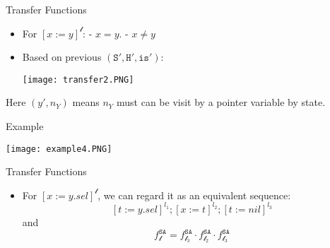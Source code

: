 \documentclass[aspectratio=1610, 13pt]{beamer}
\begin{document}
\begin{frame}{Transfer Functions}
    \begin{itemize}
        \item For $[x := y]^{\mathcal{l}}$: - $x = y$. - $x \ne y$
        \item Based on previous $(\texttt{S}', \texttt{H}', \texttt{is}')$:
        
    \begin{center}
        \texttt{[image: transfer2.PNG]}
    \end{center}
    \end{itemize}
    Here $(y', n_Y)$ means $n_Y$ must can be visit by a pointer variable by state.
\end{frame}
\begin{frame}{Example}

    \begin{center}
        \texttt{[image: example4.PNG]}
    \end{center}

    
\end{frame}

\begin{frame}{Transfer Functions}
\begin{itemize}
    \item For $[x := y.sel]^{\mathcal{l}}$, we can regard it as an equivalent sequence:
    \[[t:=y.sel]^{l_1};[x := t]^{l_2};[t := nil]^{l_3}\]
    and 
    \[{f_{\mathcal{l}}^\texttt{SA}} = {f_{\mathcal{l_3}}^\texttt{SA} \cdot f_{\mathcal{l_2}}^\texttt{SA} \cdot f_{\mathcal{l_3}}^\texttt{SA}}\]
\end{itemize}
\end{frame}
\end{document}
